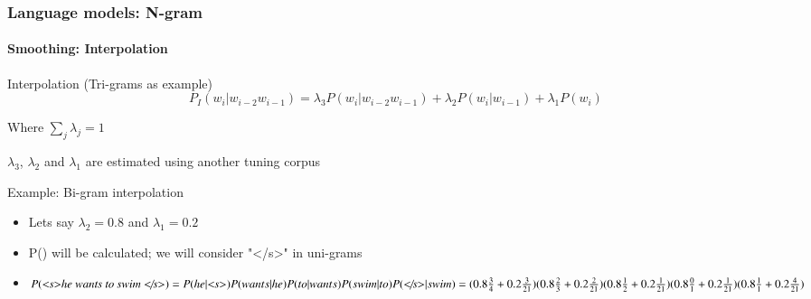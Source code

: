\documentclass[xcolor=table]{beamer}
\begin{document}
\begin{frame}
\frametitle{Language models: N-gram}
\framesubtitle{Smoothing: Interpolation}

\begin{block}{Interpolation (Tri-grams as example)}
	\[%
	P_{I}(w_i | w_{i-2} w_{i-1}) = 
	\lambda_3 P(w_i | w_{i-2} w_{i-1}) 
	+ \lambda_2 P(w_i | w_{i-1}) 
	+ \lambda_1 P(w_i) 
	\]
	
	Where $\sum_j \lambda_j = 1$
	
	$\lambda_3$, $\lambda_2$ and $\lambda_1$ are estimated using another tuning corpus
\end{block}

\begin{exampleblock}{Example: Bi-gram interpolation}
	\begin{itemize}
		\item Lets say $\lambda_2=0.8$ and $\lambda_1=0.2$
		\item P() will be calculated; we will consider "\textless/s\textgreater" in uni-grams
		\item $P(\text{\textit{\textless s\textgreater he wants to swim \textless/s\textgreater}}) = 
		P(he|\text{\textit{\textless s\textgreater}}) P(wants|he) P(to|wants) P(swim|to) P(\text{\textit{\textless/s\textgreater}}|swim) = 
		(0.8\frac{3}{4} + 0.2\frac{3}{21}) (0.8\frac{2}{3} + 0.2\frac{2}{21}) (0.8\frac{1}{2} + 0.2\frac{1}{21}) (0.8\frac{0}{1} + 0.2\frac{1}{21}) (0.8\frac{1}{1} + 0.2\frac{4}{21})$
	\end{itemize}
\end{exampleblock}

\end{frame}
\end{document}
